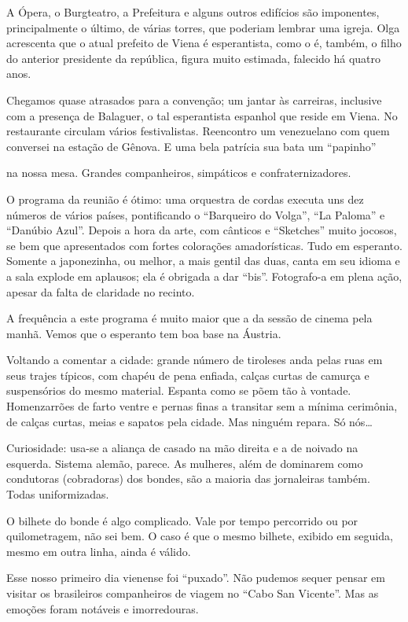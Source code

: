 A Ópera, o Burgteatro, a Prefeitura e alguns outros edifícios são imponentes, principalmente o último, de várias torres, que poderiam lembrar uma igreja. Olga acrescenta que o atual prefeito de Viena é esperantista, como o é, também, o filho do anterior presidente da república, figura muito estimada, falecido há quatro anos.

Chegamos quase atrasados para a convenção; um jantar às carreiras, inclusive com a presença de Balaguer, o tal esperantista espanhol que reside em Viena. No restaurante circulam vários festivalistas. Reencontro um venezuelano com quem conversei na estação de Gênova. E uma bela patrícia sua bata um “papinho”

na nossa mesa. Grandes companheiros, simpáticos e confraternizadores.

O programa da reunião é ótimo: uma orquestra de cordas executa uns dez números de vários países, pontificando o “Barqueiro do Volga”, “La Paloma” e “Danúbio Azul”. Depois a hora da arte, com cânticos e “Sketches” muito jocosos, se bem que apresentados com fortes colorações amadorísticas. Tudo em esperanto. Somente a japonezinha, ou melhor, a mais gentil das duas, canta em seu idioma e a sala explode em aplausos; ela é obrigada a dar “bis”. Fotografo-a em plena ação, apesar da falta de claridade no recinto.

A frequência a este programa é muito maior que a da sessão de cinema pela manhã. Vemos que o esperanto tem boa base na Áustria.

Voltando a comentar a cidade: grande número de tiroleses anda pelas ruas em seus trajes típicos, com chapéu de pena enfiada, calças curtas de camurça e suspensórios do mesmo material. Espanta como se põem tão à vontade. Homenzarrões de farto ventre e pernas finas a transitar sem a mínima cerimônia, de calças curtas, meias e sapatos pela cidade. Mas ninguém repara. Só nós\ldots

Curiosidade: usa-se a aliança de casado na mão direita e a de noivado na esquerda. Sistema alemão, parece. As mulheres, além de dominarem como condutoras (cobradoras) dos bondes, são a maioria das jornaleiras também. Todas uniformizadas.

O bilhete do bonde é algo complicado. Vale por tempo percorrido ou por quilometragem, não sei bem. O caso é que o mesmo bilhete, exibido em seguida, mesmo em outra linha, ainda é válido.

Esse nosso primeiro dia vienense foi “puxado”. Não pudemos sequer pensar em visitar os brasileiros companheiros de viagem no “Cabo San Vicente”. Mas as emoções foram notáveis e imorredouras.

